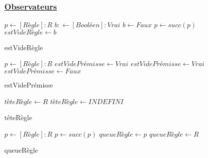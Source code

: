 \documentclass{article}
\begin{document}
\subsubsection{\underline{Observateurs}}
\begin{algorithm}
    \SetAlgoLined
    \KwResult{[Booléen]}

    \begin{algorithmic}

        \STATE $p \gets [Règle] : R$
        \STATE $b : \gets [Booléen] : Vrai$
                \STATE $b \gets Faux$
            \ENDIF
            \STATE $p \gets succ(p)$
        \ENDWHILE
        \STATE $estVideRègle \gets b$

    \end{algorithmic}
    \caption{estVideRègle}
\end{algorithm}

\begin{algorithm}
    \SetAlgoLined
    \KwResult{[booléen]}

    \begin{algorithmic}
        \STATE $p \gets [Règle] : R$
            \STATE $estVidePrémisse \gets Vrai$
        \ELSE
                \STATE $estVidePrémisse \gets Vrai$
            \ELSE
                \STATE $estVidePrémisse \gets Faux$
            \ENDIF
        \ENDIF

    \end{algorithmic}
    \caption{estVidePrémisse}
\end{algorithm}

\begin{algorithm}
    \SetAlgoLined
    \KwResult{[Proposition]}

    \begin{algorithmic}
            \STATE $têteRègle \gets R$
        \ELSE
            \STATE $têteRègle \gets INDEFINI$
        \ENDIF

    \end{algorithmic}
    \caption{têteRègle}
\end{algorithm}

\begin{algorithm}
    \SetAlgoLined
    \KwResult{[Proposition]}

    \begin{algorithmic}
        \STATE $p \gets [Règle] : R$
                \STATE $p \gets succ(p)$
            \ENDWHILE
            \STATE $queueRègle \gets p$
        \ELSE
            \STATE $queueRègle \gets R$
        \ENDIF

    \end{algorithmic}
    \caption{queueRègle}
\end{algorithm}
\end{document}
